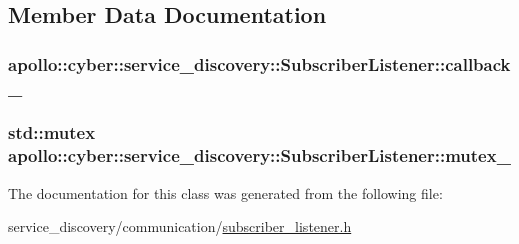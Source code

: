 \subsection{Member Data Documentation}
\hypertarget{classapollo_1_1cyber_1_1service__discovery_1_1SubscriberListener_a2027c36a05b541725ef65df62f295234}{
\subsubsection[{callback\-\_\-}]{ apollo\-::cyber\-::service\-\_\-discovery\-::\-Subscriber\-Listener\-::callback\-\_\-\hspace{0.3cm}{\ttfamily [private]}}}\label{classapollo_1_1cyber_1_1service__discovery_1_1SubscriberListener_a2027c36a05b541725ef65df62f295234}
\hypertarget{classapollo_1_1cyber_1_1service__discovery_1_1SubscriberListener_acb4397665d28253be51deaee4631c71f}{
\subsubsection[{mutex\-\_\-}]{\setlength{\rightskip}{0pt plus 5cm}std\-::mutex apollo\-::cyber\-::service\-\_\-discovery\-::\-Subscriber\-Listener\-::mutex\-\_\-\hspace{0.3cm}{\ttfamily [private]}}}\label{classapollo_1_1cyber_1_1service__discovery_1_1SubscriberListener_acb4397665d28253be51deaee4631c71f}


The documentation for this class was generated from the following file\-:\begin{DoxyCompactItemize}
\item 
service\-\_\-discovery/communication/\hyperlink{subscriber__listener_8h}{subscriber\-\_\-listener.\-h}\end{DoxyCompactItemize}
